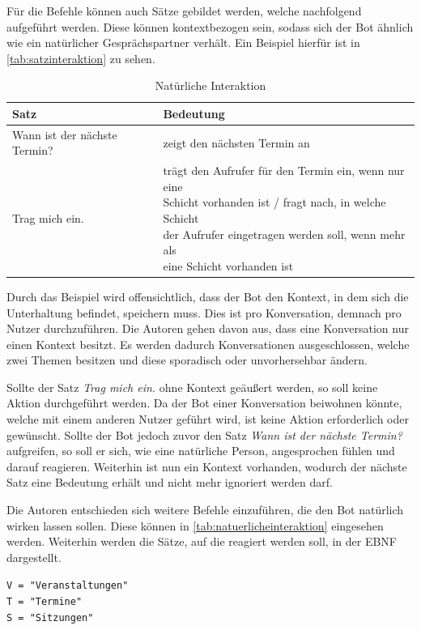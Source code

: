Für die Befehle können auch Sätze gebildet werden, welche nachfolgend aufgeführt werden. Diese können kontextbezogen sein, sodass sich der Bot ähnlich wie ein natürlicher Gesprächspartner verhält. Ein Beispiel hierfür ist in \autoref{tab:satzinteraktion} zu sehen.

\begin{table}[H]
\centering
\begin{tabular}{|l|l|}
\hline
\textbf{Satz} & \textbf{Bedeutung }\\
 \hline
Wann ist der nächste Termin? & zeigt den nächsten Termin an \\
\hline
Trag mich ein. & \makecell{trägt den Aufrufer für den Termin ein, wenn nur eine\\ Schicht vorhanden ist / fragt nach, in welche Schicht\\ der Aufrufer eingetragen werden soll, wenn mehr als\\ eine Schicht vorhanden ist} \\
\hline
\end{tabular}
\caption{Natürliche Interaktion}
\label{tab:satzinteraktion}
\end{table}

Durch das Beispiel wird offensichtlich, dass der Bot den Kontext, in dem sich die Unterhaltung befindet, speichern muss. Dies ist pro Konversation, demnach pro Nutzer durchzuführen. Die Autoren gehen davon aus, dass eine Konversation nur einen Kontext besitzt. Es werden dadurch Konversationen ausgeschlossen, welche zwei Themen besitzen und diese sporadisch oder unvorhersehbar ändern.

Sollte der Satz \textit{Trag mich ein.} ohne Kontext geäußert werden, so soll keine Aktion durchgeführt werden. Da der Bot einer Konversation beiwohnen könnte, welche mit einem anderen Nutzer geführt wird, ist keine Aktion erforderlich oder gewünscht. Sollte der Bot jedoch zuvor den Satz \textit{Wann ist der nächste Termin?} aufgreifen, so soll er sich, wie eine natürliche Person, angesprochen fühlen und darauf reagieren. Weiterhin ist nun ein Kontext vorhanden, wodurch der nächste Satz eine Bedeutung erhält und nicht mehr ignoriert werden darf.


Die Autoren entschieden sich weitere Befehle einzuführen, die den Bot natürlich wirken lassen sollen. Diese können in \autoref{tab:natuerlicheinteraktion} eingesehen werden. Weiterhin werden die Sätze, auf die reagiert werden soll, in der EBNF dargestellt.

\texttt{V = "Veranstaltungen"}\\
\texttt{T = "Termine"}\\
\texttt{S = "{}Sitzungen"}

